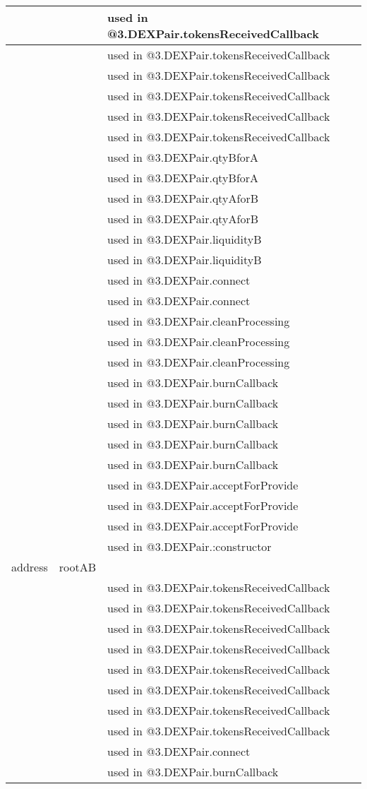 \begin{tabular}{|l|l|p{5cm}|}
 & & used in @3.DEXPair.tokensReceivedCallback\\\hline
 & & used in @3.DEXPair.tokensReceivedCallback\\\hline
 & & used in @3.DEXPair.tokensReceivedCallback\\\hline
 & & used in @3.DEXPair.tokensReceivedCallback\\\hline
 & & used in @3.DEXPair.tokensReceivedCallback\\\hline
 & & used in @3.DEXPair.tokensReceivedCallback\\\hline
 & & used in @3.DEXPair.qtyBforA\\\hline
 & & used in @3.DEXPair.qtyBforA\\\hline
 & & used in @3.DEXPair.qtyAforB\\\hline
 & & used in @3.DEXPair.qtyAforB\\\hline
 & & used in @3.DEXPair.liquidityB\\\hline
 & & used in @3.DEXPair.liquidityB\\\hline
 & & used in @3.DEXPair.connect\\\hline
 & & used in @3.DEXPair.connect\\\hline
 & & used in @3.DEXPair.cleanProcessing\\\hline
 & & used in @3.DEXPair.cleanProcessing\\\hline
 & & used in @3.DEXPair.cleanProcessing\\\hline
 & & used in @3.DEXPair.burnCallback\\\hline
 & & used in @3.DEXPair.burnCallback\\\hline
 & & used in @3.DEXPair.burnCallback\\\hline
 & & used in @3.DEXPair.burnCallback\\\hline
 & & used in @3.DEXPair.burnCallback\\\hline
 & & used in @3.DEXPair.acceptForProvide\\\hline
 & & used in @3.DEXPair.acceptForProvide\\\hline
 & & used in @3.DEXPair.acceptForProvide\\\hline
 & & used in @3.DEXPair.:constructor\\\hline
address & rootAB &  \\\hline
 & & used in @3.DEXPair.tokensReceivedCallback\\\hline
 & & used in @3.DEXPair.tokensReceivedCallback\\\hline
 & & used in @3.DEXPair.tokensReceivedCallback\\\hline
 & & used in @3.DEXPair.tokensReceivedCallback\\\hline
 & & used in @3.DEXPair.tokensReceivedCallback\\\hline
 & & used in @3.DEXPair.tokensReceivedCallback\\\hline
 & & used in @3.DEXPair.tokensReceivedCallback\\\hline
 & & used in @3.DEXPair.tokensReceivedCallback\\\hline
 & & used in @3.DEXPair.connect\\\hline
 & & used in @3.DEXPair.burnCallback\\\hline
\end{tabular}
\fi


